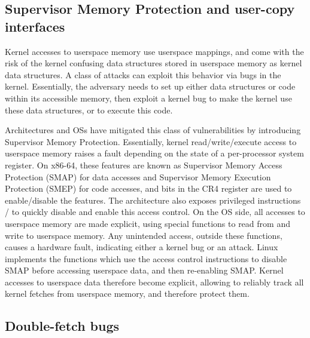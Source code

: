 \documentclass[letterpaper,twocolumn,10pt, anonymous]{article}
\begin{document}
\subsection{Supervisor Memory Protection  and user-copy interfaces}

Kernel accesses to userspace memory use userspace mappings, and 
come with the risk of the kernel confusing data structures 
stored in userspace memory as kernel data structures.
A class of attacks can exploit this behavior via bugs in the 
kernel.
Essentially, the adversary needs to set up either data structures
or code within its accessible memory, then exploit a kernel 
bug to make the kernel use these data structures, or to execute 
this code.

Architectures and OSs have mitigated this class of vulnerabilities
by introducing Supervisor Memory Protection.
Essentially, kernel read/write/execute access to userspace memory
raises a fault depending on the state of a per-processor system 
register.
On x86-64, these features are known as Supervisor Memory Access 
Protection (SMAP) for data accesses and Supervisor Memory Execution 
Protection (SMEP) for code accesses, and bits in the CR4 register 
are used to enable/disable the features.
The architecture also exposes privileged instructions 
/ to quickly disable and enable this access 
control.
On the OS side, all accesses to userspace memory are made explicit, 
using special functions to read from and write to userspace memory.
Any unintended access, outside these functions, causes a 
hardware fault, indicating either a kernel bug or an attack.
Linux implements the functions  which 
use the access control instructions to disable SMAP before 
accessing userspace data, and then re-enabling SMAP.
Kernel accesses to userspace data therefore become explicit, allowing
\tiktok to reliably track all kernel fetches from userspace memory, 
and therefore protect them.


\subsection{Double-fetch bugs}
\end{document}
